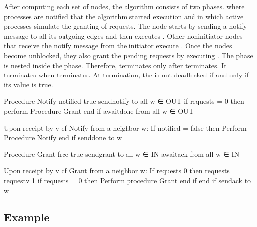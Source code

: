 \documentclass[letterpaper,10pt,english]{sphinxmanual}
\begin{document}
\sphinxAtStartPar
After computing each set of nodes, the algorithm consists of two phases.  \sphinxhyphen{} where processes are notified that the algorithm started execution \sphinxhyphen{} and  in which active processes simulate the granting of requests. The  node starts by sending a notify message to all its outgoing edges and then executes . Other non\sphinxhyphen{}initiator nodes that receive the notify message from the initiator execute . Once the nodes become unblocked, they also grant the pending requests by executing . The  phase is nested inside the  phase. Therefore,  terminates only after  terminates. It terminates when  terminates. At termination, the  is not deadlocked if and only if its  value is true.
\def\sphinxLiteralBlockLabel{\label{\detokenize{docs/BrachaTouegAlg/algorithm:id14}}\label{\detokenize{docs/BrachaTouegAlg/algorithm:brachatouegdeadlockdetectionalgorithm}}}
\begin{sphinxVerbatim}[commandchars=\\\{\},numbers=left,firstnumber=1,stepnumber=1]
Procedure Notify
notified \PYGZlt{}\PYGZhy{} true
send\PYGZlt{}notify\PYGZgt{} to all w ∈  OUT
if requests = 0 then
            perform Procedure Grant
    end if
await\PYGZlt{}done\PYGZgt{} from all w ∈ OUT

Upon receipt by v of Notify from a neighbor w:
If notified = false then
            Perform Procedure Notify
end if
send\PYGZlt{}done\PYGZgt{} to w

Procedure Grant
free \PYGZlt{}\PYGZhy{} true
send\PYGZlt{}grant\PYGZgt{} to all w ∈ IN
await\PYGZlt{}ack\PYGZgt{} from all w ∈ IN

Upon receipt by v of Grant from a neighbor w:
If requests \PYGZgt{} 0 then
            requests \PYGZlt{}\PYGZhy{} requestv \PYGZhy{} 1
    if requests = 0 then
                    Perform procedure Grant
            end if
end if
send\PYGZlt{}ack\PYGZgt{} to w
\end{sphinxVerbatim}


\subsection{Example}
\label{\detokenize{docs/BrachaTouegAlg/algorithm:example}}
\end{document}
